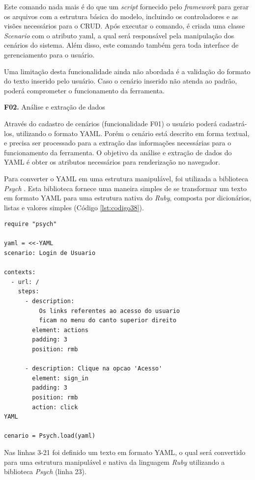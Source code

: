 Este comando nada mais é do que um \textit{script} fornecido pelo \textit{framework} para gerar os arquivos com a estrutura básica do modelo, incluindo os controladores e as visões necessários para o CRUD. Após executar o comando, é criada uma classe \textit{Scenario} com o atributo yaml, a qual será responsável pela manipulação dos cenários do sistema. Além disso, este comando também gera toda interface de gerenciamento para o usuário.

Uma limitação desta funcionalidade ainda não abordada é a validação do formato do texto inserido pelo usuário. Caso o cenário inserido não atenda ao padrão, poderá comprometer o funcionamento da ferramenta.

\textbf{F02.} Análise e extração de dados

Através do cadastro de cenários (funcionalidade F01) o usuário poderá cadastrá-los, utilizando o formato YAML. Porém o cenário está descrito em forma textual, e precisa ser processado para a extração das informações necessárias para o funcionamento da ferramenta. O objetivo da análise e extração de dados do YAML é obter os atributos necessários para renderização no navegador.

Para converter o YAML em uma estrutura manipulável, foi utilizada a biblioteca \textit{Psych} \cite{PSYCH}. Esta biblioteca fornece uma maneira simples de se transformar um texto em formato YAML para uma estrutura nativa do \textit{Ruby}, composta por dicionários, listas e valores simples (Código \ref{lst:codigo38}).

{\singlespace
\begin{lstlisting}[caption=Exemplo de cenário escrito em \textit{YAML},label={lst:codigo38}]
require "psych"

yaml = <<-YAML
scenario: Login de Usuario

contexts:
  - url: /
    steps:
      - description:
          Os links referentes ao acesso do usuario
          ficam no menu do canto superior direito
        element: actions
        padding: 3
        position: rmb

      - description: Clique na opcao 'Acesso'
        element: sign_in
        padding: 3
        position: rmb
        action: click
YAML

cenario = Psych.load(yaml)
\end{lstlisting}
}

Nas linhas 3-21 foi definido um texto em formato YAML, o qual será convertido para uma estrutura manipulável e nativa da linguagem \textit{Ruby} utilizando a biblioteca \textit{Psych} (linha 23).

